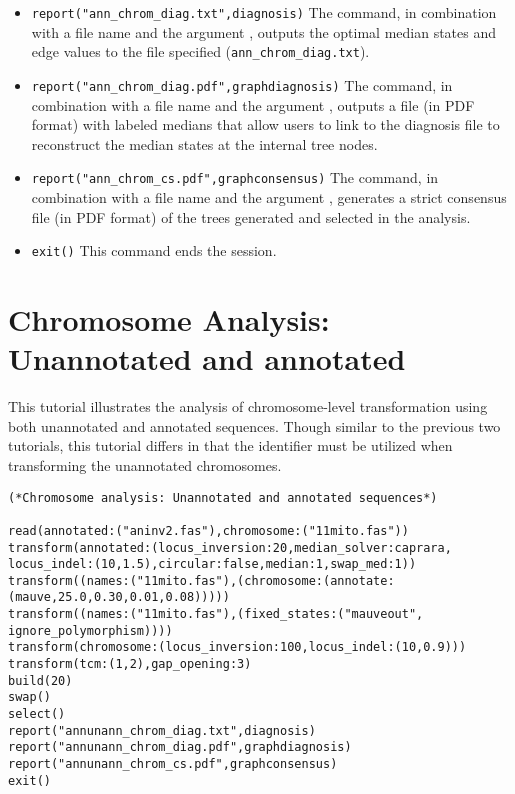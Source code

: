 \begin{itemize}
\item \texttt{report("ann\_chrom\_diag.txt",diagnosis)}  The 
command, in combination with a file name and the argument
, outputs the optimal median states and edge
values to the file specified (\texttt{ann\_chrom\_diag.txt}).  
\item \texttt{report("ann\_chrom\_diag.pdf",graphdiagnosis)}  The
 command, in combination with a file name and
the argument  , outputs a file (in PDF
format) with labeled medians that allow users to link to the diagnosis
file to reconstruct the median states at the internal tree nodes.
\item \texttt{report("ann\_chrom\_cs.pdf",graphconsensus)}  The
 command, in combination with a file name and
the argument , generates a strict
consensus file (in PDF format) of the trees generated and selected
in the analysis.  \item \texttt{exit()} This command ends the \poy
session.  
\end{itemize}


\section{Chromosome Analysis: Unannotated and annotated}{\label{tutorial10}}
This tutorial illustrates the analysis of chromosome-level transformation using 
both unannotated and annotated sequences. Though similar to the previous two 
tutorials, this tutorial differs in that the identifier  must be 
utilized when transforming the unannotated chromosomes.

\begin{verbatim}
(*Chromosome analysis: Unannotated and annotated sequences*)

read(annotated:("aninv2.fas"),chromosome:("11mito.fas"))
transform(annotated:(locus_inversion:20,median_solver:caprara,
locus_indel:(10,1.5),circular:false,median:1,swap_med:1))
transform((names:("11mito.fas"),(chromosome:(annotate:
(mauve,25.0,0.30,0.01,0.08)))))
transform((names:("11mito.fas"),(fixed_states:("mauveout",
ignore_polymorphism))))
transform(chromosome:(locus_inversion:100,locus_indel:(10,0.9)))
transform(tcm:(1,2),gap_opening:3)
build(20)
swap()
select()
report("annunann_chrom_diag.txt",diagnosis)
report("annunann_chrom_diag.pdf",graphdiagnosis)
report("annunann_chrom_cs.pdf",graphconsensus)
exit()
\end{verbatim}

